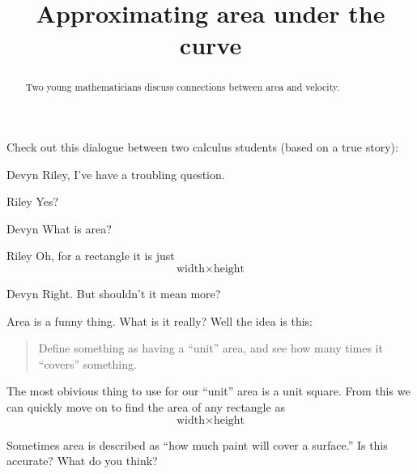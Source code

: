 \documentclass{ximera}
\title[Break-Ground:]{Approximating area under the curve}
\begin{document}
\begin{abstract}
Two young mathematicians discuss connections between
area and velocity.
\end{abstract}
\maketitle




Check out this dialogue between two calculus students (based on a true
story):

\begin{dialogue}
\item[Devyn] Riley, I've have a troubling question.
\item[Riley] Yes? 
\item[Devyn] What is area?
\item[Riley] Oh, for a rectangle it is just
  \[
  \text{width}\times \text{height}
  \]
\item[Devyn] Right. But shouldn't it mean more?
\end{dialogue}

Area is a funny thing. What is it really? Well the idea is this:
\begin{quote}
Define something as having a ``unit'' area, and see how many times it
``covers'' something.
\end{quote}
The most obivious thing to use for our ``unit'' area is a unit
square. From this we can quickly move on to find the area of any
rectangle as
  \[
  \text{width}\times \text{height}
  \]
\begin{problem}
  Sometimes area is described as ``how much paint will cover a surface.''
  Is this accurate? What do you think?
  \begin{freeResponse}
  \end{freeResponse}
\end{problem}

\end{document}

